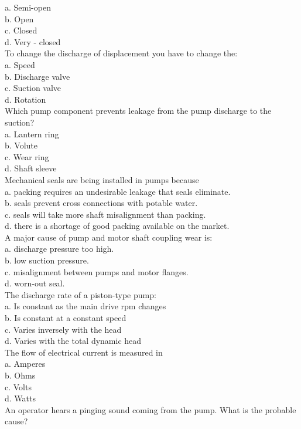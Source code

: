 a.	Semi-open\\
b.	Open\\
c.	Closed\\
d.	Very - closed\\
To change the discharge of displacement you have to change the:\\
a.	Speed\\
b.	Discharge valve\\
c.	Suction valve\\
d.	Rotation\\
Which pump component prevents leakage from the pump discharge to the suction?\\
a.  Lantern ring\\
b.  Volute\\
c.  Wear ring\\
d.  Shaft sleeve\\
Mechanical seals are being installed in pumps because\\
a.	packing requires an undesirable leakage that seals eliminate.\\
b.	seals prevent cross connections with potable water.\\
c.	seals will take more shaft misalignment than packing.\\
d.	there is a shortage of good packing available on the market.\\
A major cause of pump and motor shaft coupling wear is:\\
a.	discharge pressure too high.\\
b.	low suction pressure.\\
c.	misalignment between pumps and motor flanges.\\
d.	worn-out seal.\\
The discharge rate of a piston-type pump:\\
a. Is constant as the main drive rpm changes\\
b. Is constant at a constant speed\\
c. Varies inversely with the head\\
d. Varies with the total dynamic head\\
  The flow of electrical current is measured in\\
a. Amperes\\
b. Ohms\\
c. Volts\\
d. Watts\\
An operator hears a pinging sound coming from the pump. What is the probable cause?\\
